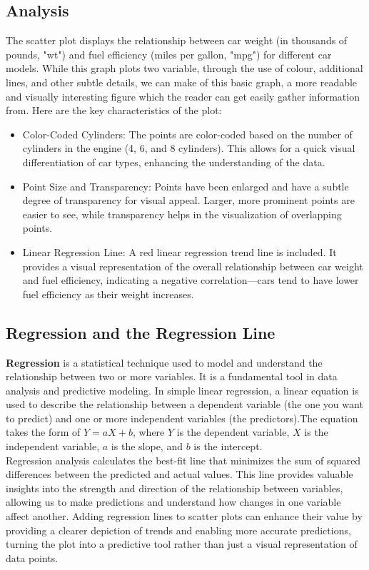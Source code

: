 \documentclass{article}\usepackage[]{graphicx}\usepackage[]{xcolor}
\begin{document}
\subsection{Analysis}
The scatter plot displays the relationship between car weight (in thousands of pounds, "wt") and fuel efficiency (miles per gallon, "mpg") for different car models. While this graph plots two variable, through the use of colour, additional lines, and other subtle details, we can make of this basic graph, a more readable and visually interesting figure which the reader can get easily gather information from. Here are the key characteristics of the plot:
\begin{itemize}
    \item Color-Coded Cylinders: The points are color-coded based on the number of cylinders in the engine (4, 6, and 8 cylinders). This allows for a quick visual differentiation of car types, enhancing the understanding of the data.
    \item Point Size and Transparency: Points have been enlarged and have a subtle degree of transparency for visual appeal. Larger, more prominent points are easier to see, while transparency helps in the visualization of overlapping points.
    \item Linear Regression Line: A red linear regression trend line is included. It provides a visual representation of the overall relationship between car weight and fuel efficiency, indicating a negative correlation—cars tend to have lower fuel efficiency as their weight increases.\\
\end{itemize}

\subsection{Regression and the Regression Line}
\textbf{Regression} is a statistical technique used to model and understand the relationship between two or more variables. It is a fundamental tool in data analysis and predictive modeling. In simple linear regression, a linear equation is used to describe the relationship between a dependent variable (the one you want to predict) and one or more independent variables (the predictors).The equation takes the form of \(Y = aX + b\), where \(Y\) is the dependent variable, \(X\) is the independent variable, \(a\) is the slope, and \(b\) is the intercept.\\
Regression analysis calculates the best-fit line that minimizes the sum of squared differences between the predicted and actual values. This line provides valuable insights into the strength and direction of the relationship between variables, allowing us to make predictions and understand how changes in one variable affect another. Adding regression lines to scatter plots can enhance their value by providing a clearer depiction of trends and enabling more accurate predictions, turning the plot into a predictive tool rather than just a visual representation of data points.
\end{document}
